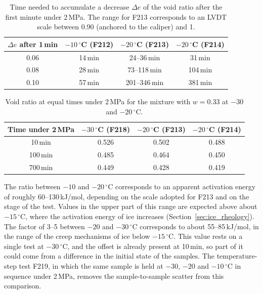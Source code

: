 \begin{table}[H]
\centering
\small
\begin{tabular}{@{}cccc@{}}
\toprule
$\Delta e$ after 1\,min & $-10\,^\circ$C (F212) & $-20\,^\circ$C (F213) & $-20\,^\circ$C (F214) \\
\midrule
0.06 & 14\,min & 24--36\,min & 31\,min \\
0.08 & 28\,min & 73--118\,min & 104\,min \\
0.10 & 57\,min & 201--346\,min & 381\,min \\
\bottomrule
\end{tabular}
\caption{Time needed to accumulate a decrease $\Delta e$ of the void ratio after the first minute under 2\,MPa. The range for F213 corresponds to an LVDT scale between 0.90 (anchored to the caliper) and 1.}
\label{tab:temperature_times}
\end{table}

\begin{table}[H]
\centering
\small
\begin{tabular}{@{}cccc@{}}
\toprule
Time under 2\,MPa & $-30\,^\circ$C (F218) & $-20\,^\circ$C (F213) & $-20\,^\circ$C (F214) \\
\midrule
10\,min & 0.526 & 0.502 & 0.488 \\
100\,min & 0.485 & 0.464 & 0.450 \\
700\,min & 0.449 & 0.428 & 0.419 \\
\bottomrule
\end{tabular}
\caption{Void ratio at equal times under 2\,MPa for the mixture with $w = 0.33$ at $-30$ and $-20\,^\circ$C.}
\label{tab:temperature_e}
\end{table}

The ratio between $-10$ and $-20\,^\circ$C corresponds to an apparent activation energy of roughly 60--130\,kJ/mol, depending on the scale adopted for F213 and on the stage of the test. Values in the upper part of this range are expected above about $-15\,^\circ$C, where the activation energy of ice increases (Section~\ref{sec:ice_rheology}). The factor of 3--5 between $-20$ and $-30\,^\circ$C corresponds to about 55--85\,kJ/mol, in the range of the creep mechanisms of ice below $-15\,^\circ$C. This value rests on a single test at $-30\,^\circ$C, and the offset is already present at 10\,min, so part of it could come from a difference in the initial state of the samples. The temperature-step test F219, in which the same sample is held at $-30$, $-20$ and $-10\,^\circ$C in sequence under 2\,MPa, removes the sample-to-sample scatter from this comparison.

